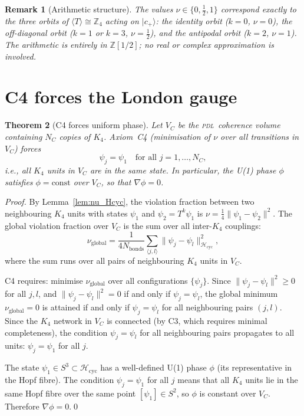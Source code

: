 \documentclass[12pt,a4paper]{article}
\newtheorem{theorem}{Theorem}[section]
\newtheorem{remark}[theorem]{Remark}
\newcommand{\Kfour}{K_4}
\newcommand{\PDL}{\textsc{pdl}}
\newcommand{\Hcyc}{\mathcal{H}_{\mathrm{cyc}}}
\newcommand{\cplu}{|c_+\rangle}
\begin{document}
\begin{remark}[Arithmetic structure]
The values $\nu \in \{0, \tfrac{1}{2}, 1\}$ correspond exactly to the three orbits of $\langle T\rangle \cong \mathbb{Z}_4$ acting on $\cplu$: the identity orbit ($k=0$, $\nu=0$), the off-diagonal orbit ($k=1$ or $k=3$, $\nu=\tfrac{1}{2}$), and the antipodal orbit ($k=2$, $\nu=1$). The arithmetic is entirely in $\mathbb{Z}[1/2]$; no real or complex approximation is involved.
\end{remark}

\section{C4 forces the London gauge}
\label{sec:C4_London}

\begin{theorem}[C4 forces uniform phase]
\label{thm:C4_London}
Let $V_C$ be the \PDL\ coherence volume containing $N_C$ copies of $\Kfour$. Axiom~C4 (minimisation of $\nu$ over all transitions in $V_C$) forces
\begin{equation}
\psi_j = \psi_1 \quad \text{for all } j = 1, \ldots, N_C,
\label{eq:uniform_phase}
\end{equation}
i.e., all $\Kfour$ units in $V_C$ are in the same state. In particular, the U(1) phase $\phi$ satisfies $\phi = \mathrm{const}$ over $V_C$, so that $\nabla\phi = 0$.
\end{theorem}

\begin{proof}
By Lemma~\ref{lem:nu_Hcyc}, the violation fraction between two neighbouring $\Kfour$ units with states $\psi_1$ and $\psi_2 = T^k\psi_1$ is $\nu = \tfrac{1}{4}\|\psi_1 - \psi_2\|^2$. The global violation fraction over $V_C$ is the sum over all inter-$\Kfour$ couplings:
\begin{equation}
\nu_{\mathrm{global}} = \frac{1}{4N_\mathrm{bonds}} \sum_{\langle j,l\rangle} \|\psi_j - \psi_l\|^2_{\Hcyc},
\label{eq:nu_global}
\end{equation}
where the sum runs over all pairs of neighbouring $\Kfour$ units in $V_C$.

C4 requires: minimise $\nu_{\mathrm{global}}$ over all configurations $\{\psi_j\}$. Since $\|\psi_j - \psi_l\|^2 \geq 0$ for all $j,l$, and $\|\psi_j - \psi_l\|^2 = 0$ if and only if $\psi_j = \psi_l$, the global minimum $\nu_{\mathrm{global}} = 0$ is attained if and only if $\psi_j = \psi_l$ for all neighbouring pairs $(j,l)$. Since the $\Kfour$ network in $V_C$ is connected (by C3, which requires minimal completeness), the condition $\psi_j = \psi_l$ for all neighbouring pairs propagates to all units: $\psi_j = \psi_1$ for all $j$.

The state $\psi_1 \in S^3 \subset \Hcyc$ has a well-defined U(1) phase $\phi$ (its representative in the Hopf fibre). The condition $\psi_j = \psi_1$ for all $j$ means that all $\Kfour$ units lie in the same Hopf fibre over the same point $[\psi_1] \in S^2$, so $\phi$ is constant over $V_C$. Therefore $\nabla\phi = 0$.\qed
\end{proof}
\end{document}
